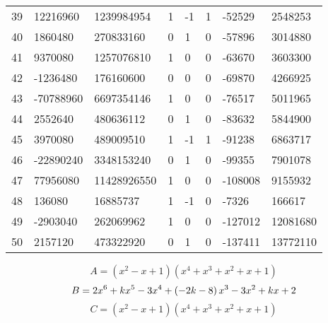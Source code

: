 \documentclass{amsart}
\begin{document}
\begin{longtable}{|l|l|l|lllll|}
39&12216960&1239984954&1&-1&1&-52529&2548253\\
40&1860480&270833160&0&1&0&-57896&3014880\\
41&9370080&1257076810&1&0&0&-63670&3603300\\
42&-1236480&176160600&0&0&0&-69870&4266925\\
43&-70788960&6697354146&1&0&0&-76517&5011965\\
44&2552640&480636112&0&1&0&-83632&5844900\\
45&3970080&489009510&1&-1&1&-91238&6863717\\
46&-22890240&3348153240&0&1&0&-99355&7901078\\
47&77956080&11428926550&1&0&0&-108008&9155932\\
48&136080&16885737&1&-1&0&-7326&166617\\
49&-2903040&262069962&1&0&0&-127012&12081680\\
50&2157120&473322920&0&1&0&-137411&13772110\\
\hline
\end{longtable}
$$A=(x^2
 - x
 + 1)(x^4
 + x^3
 + x^2
 + x
 + 1)$$
$$B=2\*x^6
 + k\*x^5
 - 3\*x^4
 + \left(-2\*k
 - 8\right) \*x^3
 - 3\*x^2
 + k\*x
 + 2$$
$$C=(x^2
 - x
 + 1)(x^4
 + x^3
 + x^2
 + x
 + 1)$$
\end{document}
